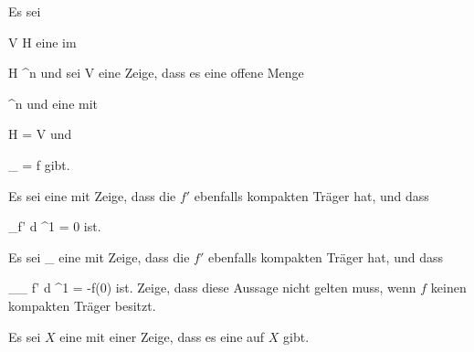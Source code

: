 {}
{

Es sei

\mavergleichskette
{\vergleichskette
{ V
}
{ \subseteq }{ H
}
{  }{
}
{    }{
}
{   }{
}
}
{}{}{}
eine
im

\mavergleichskette
{\vergleichskette
{ H
}
{ \subset }{ \R^n
}
{  }{
}
{    }{
}
{   }{
}
}
{}{}{}
und sei
 { V } {\R
} {}
eine
Zeige, dass es eine offene Menge

\mavergleichskette
{\vergleichskette
{ 
}
{ \subseteq }{ \R^n
}
{  }{
}
{    }{
}
{   }{
}
}
{}{}{}
und eine
 {} { \R
} {}
mit

\mavergleichskette
{\vergleichskette
{  \cap H
}
{ = }{ V
}
{  }{
}
{    }{
}
{   }{
}
}
{}{}{}
und

\mavergleichskette
{\vergleichskette
{  \vert_{ }
}
{ = }{ f
}
{  }{
}
{    }{
}
{   }{
}
}
{}{}{}
gibt.

}
{} {}

{}
{

Es sei
 {\R} {\R
} {}
eine
mit
Zeige, dass die
$f'$ ebenfalls kompakten Träger hat, und dass

\mavergleichskette
{\vergleichskette
{ \int_\R f' d \lambda^1
}
{ = }{ 0
}
{  }{
}
{    }{
}
{   }{
}
}
{}{}{}
ist.

}
{} {}

{}
{

Es sei
 {\R_{}} {\R
} {}
eine
mit
Zeige, dass die
$f'$ ebenfalls kompakten Träger hat, und dass

\mavergleichskette
{\vergleichskette
{ \int_{\R_{} } f' d \lambda^1
}
{ = }{ -f(0)
}
{  }{
}
{    }{
}
{   }{
}
}
{}{}{}
ist. Zeige, dass diese Aussage nicht gelten muss, wenn $f$ keinen kompakten Träger besitzt.

}
{} {}

{}
{

Es sei $X$ eine
mit einer
Zeige, dass es eine
auf $X$ gibt.

}
{} {}

